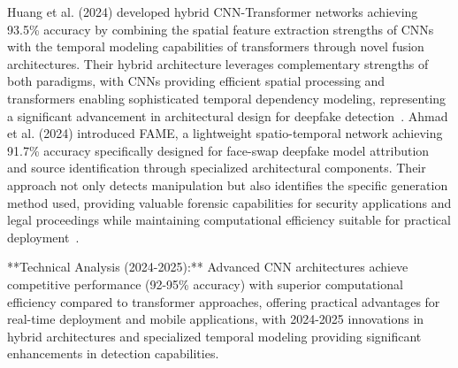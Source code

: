 \documentclass[conference]{IEEEtran}
\begin{document}
Huang et al. (2024) developed hybrid CNN-Transformer networks achieving 93.5\% accuracy by combining the spatial feature extraction strengths of CNNs with the temporal modeling capabilities of transformers through novel fusion architectures. Their hybrid architecture leverages complementary strengths of both paradigms, with CNNs providing efficient spatial processing and transformers enabling sophisticated temporal dependency modeling, representing a significant advancement in architectural design for deepfake detection~\cite{huang2024hybrid}.
Ahmad et al. (2024) introduced FAME, a lightweight spatio-temporal network achieving 91.7\% accuracy specifically designed for face-swap deepfake model attribution and source identification through specialized architectural components. Their approach not only detects manipulation but also identifies the specific generation method used, providing valuable forensic capabilities for security applications and legal proceedings while maintaining computational efficiency suitable for practical deployment~\cite{ahmad2024fame}.

**Technical Analysis (2024-2025):** Advanced CNN architectures achieve competitive performance (92-95\% accuracy) with superior computational efficiency compared to transformer approaches, offering practical advantages for real-time deployment and mobile applications, with 2024-2025 innovations in hybrid architectures and specialized temporal modeling providing significant enhancements in detection capabilities.



\end{document}
